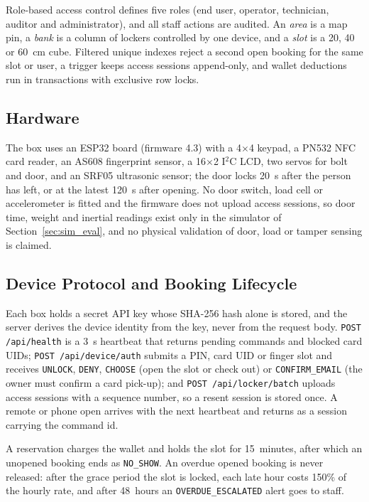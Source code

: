 \documentclass[sigconf,screen]{acmart}
\begin{document}
Role-based access control defines five roles (end user, operator, technician, auditor and administrator), and all
staff actions are audited. An \emph{area} is a map pin, a \emph{bank} is
a column of lockers controlled by one device, and a \emph{slot} is a 20, 40 or 60~cm cube. Filtered unique indexes
reject a second open booking for the same slot or user, a trigger keeps access sessions append-only, and wallet
deductions run in transactions with exclusive row locks.

\subsection{Hardware}

The box uses an ESP32 board (firmware 4.3) with a 4$\times$4 keypad, a PN532 NFC card reader, an AS608 fingerprint
sensor, a 16$\times$2 I$^2$C LCD, two servos for bolt and door, and an SRF05 ultrasonic sensor; the door locks 20~s
after the person has left, or at the latest 120~s after opening. No door switch, load cell or accelerometer is
fitted and the firmware does not upload access sessions, so door time, weight and inertial readings exist only in the
simulator of Section~\ref{sec:sim_eval}, and no physical validation of door, load or tamper sensing is claimed.

\subsection{Device Protocol and Booking Lifecycle}

Each box holds a secret API key whose SHA-256 hash alone is stored, and the server derives the device identity from
the key, never from the request body. \texttt{POST /api/health} is a 3~s heartbeat that returns pending commands and
blocked card UIDs; \texttt{POST /api/device/auth} submits a PIN, card UID or finger slot and receives
\texttt{UNLOCK}, \texttt{DENY}, \texttt{CHOOSE} (open the slot or check out) or \texttt{CONFIRM\_EMAIL} (the owner
must confirm a card pick-up); and \texttt{POST /api/locker/batch}
uploads access sessions with a sequence number, so a resent session is stored once. A remote or phone open arrives
with the next heartbeat and returns as a session carrying the command id.

A reservation charges the wallet and holds the slot for 15~minutes, after which an unopened booking ends as
\texttt{NO\_SHOW}. An overdue opened booking is never released: after the grace period the slot is locked, each late hour costs 150\% of the hourly rate, and after 48~hours an
\texttt{OVERDUE\_ESCALATED} alert goes to staff.
\end{document}
